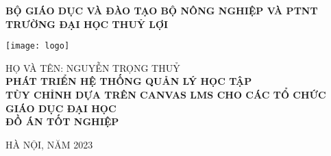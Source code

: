 \documentclass[main-report.tex]{subfiles}
\begin{document}
\begin{titlepage}
\thispagestyle{empty}
\thisfancypage{
\setlength{\fboxsep}{3pt}
\fbox}{} 
\begin{center}
{\bf\large BỘ GIÁO DỤC VÀ ĐÀO TẠO \hspace{1.5cm} BỘ NÔNG NGHIỆP VÀ PTNT}\\
{\bf\subtitlesize TRƯỜNG ĐẠI HỌC THUỶ LỢI}\\[4cm]

{
\vspace*{-6\baselineskip}
\hspace*{0\textwidth}\texttt{[image: logo]}
\par\vspace*{4\baselineskip}
}
{\large HỌ VÀ TÊN: NGUYỄN TRỌNG THUỶ}\\
\vspace{4\baselineskip}
{\bf\Large PHÁT TRIỂN HỆ THỐNG QUẢN LÝ HỌC TẬP}\\
{\bf\Large TÙY CHỈNH DỰA TRÊN CANVAS LMS CHO CÁC TỔ CHỨC GIÁO DỤC ĐẠI HỌC}\\[4cm]
{\bf ĐỒ ÁN TỐT NGHIỆP}\\
\end{center}
\vspace{6cm}
\begin{center}
{\large HÀ NỘI, NĂM 2023}
\end{center}
\end{titlepage}
\end{document}

